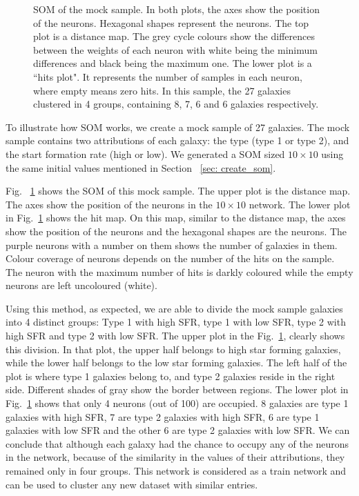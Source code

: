 \begin{figure}
\begin{subfigure}[b]{0.5\textwidth}
            \end{subfigure}
            \caption{SOM of the mock sample. In both plots, the axes show the position of the neurons. Hexagonal shapes represent the neurons. The top plot is a distance map. The grey cycle colours show the differences between the weights of each neuron with white being the minimum differences and black being the maximum one. The lower plot is a ``hits plot". It represents the number of samples in each neuron, where empty means zero hits. In this sample, the 27 galaxies clustered in 4 groups, containing 8, 7, 6 and 6 galaxies respectively.}
            \label{fig: sample}
        \end{figure}
 
 To illustrate how SOM works, we create a mock sample of 27 galaxies.
 The mock sample contains two attributions of each galaxy: the type (type 1 or type 2), and the start formation rate (high or low). 
 We generated a SOM sized $10 \times 10$ using the same initial values mentioned in Section ~\ref{sec: create_som}.

 Fig. ~\ref{fig: sample} shows the SOM of this mock sample. 
 The upper plot is the distance map. 
 The axes show the position of the neurons in the $10 \times 10$ network.
 The lower plot in Fig.~\ref{fig: sample} shows the hit map.
 On this map, similar to the distance map, the axes show the position of the neurons and the hexagonal shapes are the neurons.
 The purple neurons with a number on them shows the number of galaxies in them.
 Colour coverage of neurons depends on the number of the hits on the sample.
 The neuron with the maximum number of hits is darkly coloured while the empty neurons are left uncoloured (white).
 
Using this method, as expected, we are able to divide the mock sample galaxies into 4 distinct groups: Type 1 with high SFR, type 1 with low SFR, type 2 with high SFR and type 2 with low SFR. 
The upper plot in the Fig.~\ref{fig: sample}, clearly shows this division.
In that plot, the upper half belongs to high star forming galaxies, while the lower half belongs to the low star forming galaxies.
The left half of the plot is where type 1 galaxies belong to, and type 2 galaxies reside in the right side.
Different shades of gray show the border between regions.
The lower plot in Fig.~\ref{fig: sample} shows that only 4 neurons (out of 100) are occupied. 
8 galaxies are type 1 galaxies with high SFR, 7 are type 2 galaxies with high SFR, 6 are type 1 galaxies with low SFR and the other 6 are type 2 galaxies with low SFR. 
We can conclude that although each galaxy had  the chance to occupy any of the neurons in the network, because of the similarity in the values of their attributions, they remained only in four groups.
This network is considered as a train network and can be used to cluster any new dataset with similar entries.


